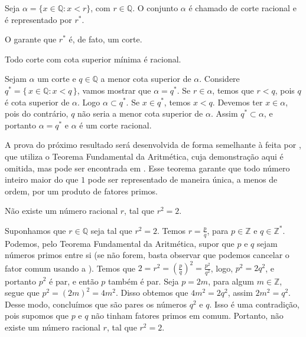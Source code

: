 \documentclass[../main.tex]{subfiles}
\begin{document}
\begin{defi}
    Seja $\alpha = \{ x \in \mathbb{Q} : x < r \}$, com $r \in \mathbb{Q}$. O conjunto $\alpha$ é chamado de corte racional e é representado por $r^*$.
\end{defi}

\begin{obs}
    O  garante que $r^*$ é, de fato, um corte.
\end{obs}

\begin{teo}
    Todo corte com cota superior mínima é racional.
\end{teo}
\begin{dem}
    Sejam $\alpha$ um corte e $q \in \mathbb{Q}$ a menor cota superior de $\alpha$. Considere \\ 
    $q^* = \{\, x \in \mathbb{Q} : x < q \,\}$, vamos mostrar que $\alpha = q^*$.
    Se $r \in \alpha$, temos que $r < q$, pois $q$ é cota superior de $\alpha$. Logo $\alpha \subset q^*$. Se $x \in q^*$, temos $x < q$. Devemos ter $x \in \alpha$, pois do contrário, $q$ não seria a menor cota superior de $\alpha$. Assim $q^* \subset \alpha$, e portanto $\alpha = q^*$ e $\alpha$ é um corte racional.
\end{dem}

A prova do próximo resultado será desenvolvida de forma semelhante à feita por \textcite{alfeld}, que utiliza o Teorema Fundamental da Aritmética, cuja demonstração aqui é omitida, mas pode ser encontrada em \textcite[p. 9]{santos}. Esse teorema garante que todo número inteiro maior do que $1$ pode ser representado de maneira única, a menos de ordem, por um produto de fatores primos.

\begin{prop}\label{reais-prop-raizQuadradaDoisIrracional}
    Não existe um número racional $r$, tal que $r^2 = 2$.
\end{prop}
\begin{dem}
    Suponhamos que $r \in \mathbb{Q}$ seja tal que $r^2 = 2$. Temos $r = \frac{p}{q}$, para $p \in \mathbb{Z}$ e $q \in \mathbb{Z}^*$. Podemos, pelo Teorema Fundamental da Aritmética, supor que $p$ e $q$ sejam números primos entre si (se não forem, basta observar que podemos cancelar o fator comum usando a ). Temos que $2 = r^2 = \left( \frac{p}{q} \right)^2 = \frac{p^2}{q^2}$, logo, $p^2 = 2q^2$, e portanto $p^2$ é par, e então $p$ também é par. Seja $p = 2m$, para algum $m \in \mathbb{Z}$, segue que $p^2= (2m)^2 = 4m^2$. Disso obtemos que $4m^2 = 2q^2$, assim $2m^2 = q^2$. Desse modo, concluímos que são pares os números $q^2$ e $q$. Isso é uma contradição, pois supomos que $p$ e $q$ não tinham fatores primos em comum. Portanto, não existe um número racional $r$, tal que $r^2 = 2$.
\end{dem}
\end{document}

